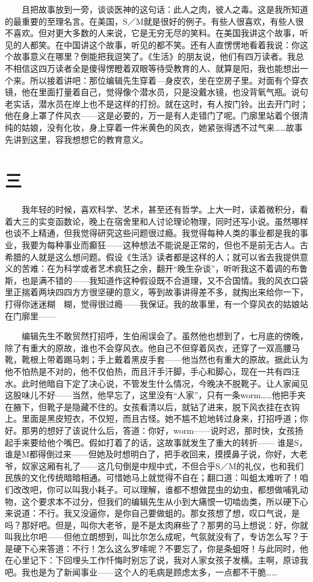 　　且把故事放到一旁，谈谈医神的这句话：此人之肉，彼人之毒。这是我所知道的最重要的至理名言。在美国，S／M就是很好的例子。有些人很喜欢，有些人很不喜欢。但对更大多数的人来说，它是无穷无尽的笑料。在美国我讲这个故事，听见的人都笑。在中国讲这个故事，听见的都不笑。还有人直愣愣地看着我说：你这个故事意义在哪里？倒能把我逗笑了。《生活》的朋友说，他们有四万读者。我总不相信这四万读者全是傻得愣瞪着双眼等待受教育的人、就算是阳，我也能想出一个来。所以接着讲吧：那位编辑先生穿着—身皮农，坐在空房子里。对面有个穿衣镜，他在里面打量着自己，觉得像个潜水员，只是没戴水镜，也没背氧气瓶。说句老实话，潜水员在岸上也不是这样的打扮。就在这时，有人按门铃。出去开门时；他在身上罩了件风衣——这是必要的，万一是有人走错门了呢。门廓里站着个很清纯的姑娘，没有化妆，身上穿着一件米黄色的风衣，她紧张得透不过气来……故事先讲到这里，容我想想它的教育意义。 

\section{三} 

　　我年轻的时候，喜欢科学、艺术，甚至还有哲学。上大一时，读着微积分，看着大三的实变函数论，晚上在宿舍里和人讨论理论物理，同时还写小说。虽然哪样也谈不上精通，但我觉得研究这些问题很过瘾。我觉得每种人类的事业都是我的事业，我要为每种事业而癫狂——这种想法不能说是正常的，但也不是前无古人。古希腊的人就是这么想问题。假设《生活》读者都是这样的人；就可以省去我提供意义的苦难：在为科学或者艺术疯狂之余，翻开“晚生杂谈”，听听我这不着调的布鲁斯，也是满不错的——我知道作这种假设既不合道理，又不合国情。我的风衣口袋里正揣着两块四四方方很坚硬的意义，等到故事讲得差不多，就掏出来给你一下，打得你迷迷糊　糊，觉得很过瘾——我保证。我的故事里，有一个穿风衣的姑娘站在门廓里—— 

　　编辑先生不敢贸然打招呼，生伯闹误会了。虽然他也想到了，七月底的傍晚，除了有重大的原故，谁也不会穿风衣。他自己不但穿着风衣，还穿了一双高腰马靴，靴根上带着踢马刺；手上戴着黑皮手套——他当然也有重大的原故。据此认为他不怕热是不对的，他不仅伯热，而且汗手汗脚，手心和脚心，现在一共有四汪水。此时他暗自下定了决心说，不管发生什么情况，今晚决不脱靴子。让人家闻见这股味儿不好——当然，他早忘了，这里没有“人家”，只有一条worm……他把手夹在腋下，但靴子是隐藏不住的。女孩看清以后，就钻了进来，脱下风衣挂在衣钩上。里面是黑皮短衣，不仅短，而且古怪。她不尴不尬地转过身来，打招呼道；你好。那男的想好了该说什么后，答道：你好，worm——说时迟，那时快，女孩扬起手来要给他个嘴巴。假如打着了的话，这故事就发生了重大的转折—— 谁是S，谁是M都得倒过来——但她及时想明白了，把手收回来，摸摸鼻子说，你好，大老爷，奴家这厢有礼了——这几句倒是中规中式，不但合乎S／M的礼仪，也和我们民族的文化传统暗暗相通。可惜她马上就觉得不自在；翻口道：叫蛆太难听了！咱们改改吧，你可以叫我小耗子。可以理解，谁都不想做昆虫的幼虫，都想做哺乳动物，这个要求本不过分，但我们的编辑先生从小到大痛恨一切啮齿类，所以硬下心来说道：不行。我又没逼你，是你自己要做蛆的。那女孩想了想，叹口气说，是吗？那好吧。但是，叫你大老爷，是不是太肉麻些了？那男的马上想说：好，你就叫我比尔吧——但他立朗想到，叫比尔怎么成呢，气氛就没有了，专访怎么写？于是硬下心来答道：不行！怎么这么罗嗦呢？不要忘了，你是条蛆呀！与此同时，他在心里记下：下回埋头工作忏悔时别忘了说，我对人家女孩子发横。主啊，原谅我吧。我也是为了新闻事业——这个人的毛病是顾虑太多，一点都不干脆…… 

